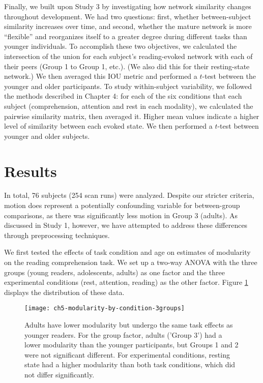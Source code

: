 Finally, we built upon Study 3 by investigating how network similarity changes throughout development. We had two questions: first, whether between-subject similarity increases over time, and second, whether the mature network is more ``flexible'' and reorganizes itself to a greater degree during different tasks than younger individuals. To accomplish these two objectives, we calculated the intersection of the union for each subject's reading-evoked network with each of their peers (Group 1 to Group 1, etc.). (We also did this for their resting-state network.) We then averaged this IOU metric and performed a $t$-test between the younger and older participants. To study within-subject variability, we followed the methods described in Chapter 4: for each of the six conditions that each subject (comprehension, attention and rest in each modality), we calculated the pairwise similarity matrix, then averaged it. Higher mean values indicate a higher level of similarity between each evoked state. We then performed a $t$-test between younger and older subjects.


\section{Results}

In total, 76 subjects (254 scan runs) were analyzed. Despite our stricter criteria, motion does represent a potentially confounding variable for between-group comparisons, as there was significantly less motion in Group 3 (adults). As discussed in Study 1, however, we have attempted to address these differences through preprocessing techniques.

We first tested the effects of task condition and age on estimates of modularity on the reading comprehension task. We set up a two-way ANOVA with the three groups (young readers, adolescents, adults) as one factor and the three experimental conditions (rest, attention, reading) as the other factor. Figure \ref{fig:ch5-modularity-by-condition-3groups} displays the distribution of these data. 

\begin{figure}[t]
	\centering
	\texttt{[image: ch5-modularity-by-condition-3groups]}
    \caption[Adults have lower modularity but undergo the same task effects as younger readers]{Adults have lower modularity but undergo the same task effects as younger readers. For the group factor, adults ('Group 3') had a lower modularity than the younger participants, but Groups 1 and 2 were not significant different. For experimental conditions, resting state had a higher modularity than both task conditions, which did not differ significantly.}
	\label{fig:ch5-modularity-by-condition-3groups}
\end{figure}

